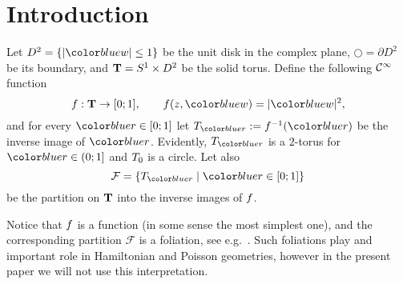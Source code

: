 \newcommand\fGTotal{\fGrp{ 0 }}
\newcommand\fGFixZR{\fGrp{ 1 }}
\newcommand\fGLin{\fGrp{ 2 }}

\newcommand\fGFixSandw{\fGrp{ 3 }}
\newcommand\fGFixCollar{\fGrp{ 4 }}

\newcommand\TFoliation{\mathcal{F}}
\newcommand\KFoliation{\mathcal{G}}
\newcommand\SFoliation{\widehat{\KFoliation}}


\newcommand\DLpKdK{\FolLpDiff(\KFoliation,\partial\SKlein)}
\newcommand\DLpK{\FolLpDiff(\KFoliation)}
\newcommand\DFolKdk{\FolDiff(\KFoliation,\partial\SKlein)}
\newcommand\DFolK{\FolDiff(\KFoliation)}

\newcommand\DiffRCommShift{\Diff_{\eta}^{+}(\bR)}



\newcommand\RCircle[1]{S_{#1}}   %
\newcommand\RDisk[1]{D_{#1}}     %
\newcommand\RTD[1]{T_{#1}}                %
\newcommand\RSkl[1]{\mathbf{K}_{#1}}      %
\newcommand\RBd[1]{\mathbf{C}^{#1}}       %
\newcommand\XC{\Klev{0}}



\newcommand\aConst{0.2}
\newcommand\bConst{0.8}

\newcommand\Hhom{H}
\newcommand\Ghom{G}
\newcommand\nrm[1]{\vert#1\vert}


\newcommand\vba{a}
\newcommand\vbb{b}
\newcommand\vbc{c}

\newcommand\CRRaa{\Cinfty_{*}(\bR,\bR)}



\section{Introduction}
Let $D^2 = \{|\aw|\leq 1\}$ be the unit disk in the complex plane, $\Circle=\partial D^2$ be its boundary, and $\mathbf{T} = S^1\times D^2$ be the solid torus.
Define the following $\mathcal{C}^{\infty}$ function 
\[
    \func:\STorus\to[0;1],
    \qquad 
    \func(\az,\aw) = \nrm{\aw}^2,
\]
and for every $\arad\in[0;1]$ let $\Tlev{\arad}:=\func^{-1}(\arad)$ be the inverse image of $\arad$.
Evidently, $\Tlev{\arad}$ is a $2$-torus for $\arad\in(0;1]$ and $T_{0}$ is a circle.
Let also 
\[ 
    \TFoliation = \{ \Tlev{\arad}\mid\arad\in[0;1]\}
\]
be the partition on $\mathbf{T}$ into the inverse images of $f$.

Notice that $f$ is a  function (in some sense the most simplest one), and the corresponding partition $\TFoliation$ is a  foliation, see e.g.~\cite{Bott:IHES:1988, MartinezAlfaroMezaSarmientoOliveira:TMNA:2018, EvangelistaSuarezTorresVera:JS:2019}.
Such foliations play and important role in Hamiltonian and Poisson geometries, however in the present paper we will not use this interpretation.

